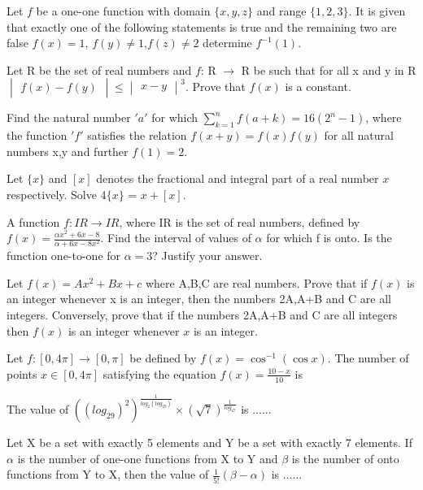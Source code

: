 \item Let $f$ be a one-one function with domain $\{x,y,z\}$ and range $\{1,2,3\}$. It is given that exactly one of the following statements is true and the remaining two are false $f(x)=1$, $f(y) \neq 1$,$f(z) \neq 2$ determine $f^{-1}(1)$. 
 
\item Let R be the set of real numbers and $f$: R $\rightarrow$ R be such that for all x and y in R$\begin{vmatrix} f(x)-f(y) \end{vmatrix} \leq \begin{vmatrix} x-y \end{vmatrix}^3$. Prove that $f(x)$ is a constant.

\item Find the natural number $'a'$ for which $\sum_{k=1}^{n} f(a+k) = 16(2^n-1)$, where the function $'f'$ satisfies the relation $f(x+y)=f(x)f(y)$ for all natural numbers x,y and further $f(1)=2$.

\item Let $\{x\}$ and $[x]$ denotes the fractional and integral part of a real number $x$ respectively. Solve 4$\{x\}$ = $x+[x]$.

\item A function $f: IR \rightarrow IR$, where IR is the set of real numbers, defined by $f(x)=\frac{\alpha x^{2}+6x-8}{\alpha+6x-8x^{2}}$. Find the interval of values of $\alpha$ for which f is onto. Is the function one-to-one for $\alpha = 3$? Justify your answer.

\item Let $f(x) = Ax^{2}+Bx+c$ where A,B,C are real numbers. Prove that if $f(x)$ is an integer whenever x is an integer, then the numbers 2A,A+B and C are all integers. Conversely, prove that if the numbers 2A,A+B and C are all integers then $f(x)$ is an integer whenever $x$ is an integer.

\item Let $f: [0,4\pi] \rightarrow [0,\pi]$ be defined by $f(x)=\cos^{-1}(\cos x)$. The number of points $x \in [0,4\pi]$ satisfying the equation $f(x)=\frac{10-x}{10}$ is

\item The value of $((log_29)^{2})^{\frac{1}{log_2(log_29)}} \times (\sqrt{7})^{\frac{1}{log_47}}$ is ......

\item Let X be a set with exactly 5 elements and Y be a set with exactly 7 elements. If $\alpha$ is the number of one-one functions from X to Y and $\beta$ is the number of onto functions from Y to X, then the value of $\frac{1}{5!}(\beta-\alpha)$ is ......

